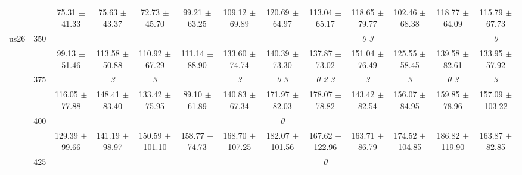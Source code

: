 \begin{table}[h]
{\begin{tabular}{
        ccccccccccccc}
 & & \cellcolor[HTML]{EFEFEF} 75.31 $\pm$ 41.33& \cellcolor[HTML]{EFEFEF} 75.63 $\pm$ 43.37& \cellcolor[HTML]{EFEFEF} 72.73 $\pm$ 45.70& \cellcolor[HTML]{EFEFEF} 99.21 $\pm$ 63.25& \cellcolor[HTML]{EFEFEF} 109.12 $\pm$ 69.89& \cellcolor[HTML]{EFEFEF} 120.69 $\pm$ 64.97& \cellcolor[HTML]{EFEFEF} 113.04 $\pm$ 65.17& \cellcolor[HTML]{EFEFEF} 118.65 $\pm$ 79.77& \cellcolor[HTML]{EFEFEF} 102.46 $\pm$ 68.38& \cellcolor[HTML]{EFEFEF} 118.77 $\pm$ 64.09& \cellcolor[HTML]{EFEFEF} 115.79 $\pm$ 67.73 \\ 
 \multirow{4}{*}{us26} & \multirow{2}{*}{350}& & & & & & & & \textit{ 0 3 }& & & \textit{ 0 } \\ 
 & & 99.13 $\pm$ 51.46& 113.58 $\pm$ 50.88& 110.92 $\pm$ 67.29& 111.14 $\pm$ 88.90& 133.60 $\pm$ 74.74& 140.39 $\pm$ 73.30& 137.87 $\pm$ 73.02& 151.04 $\pm$ 76.49& 125.55 $\pm$ 58.45& 139.58 $\pm$ 82.61& 133.95 $\pm$ 57.92 \\ 
 & \multirow{2}{*}{375}& \cellcolor[HTML]{EFEFEF} & \cellcolor[HTML]{EFEFEF} \textit{ 3 }& \cellcolor[HTML]{EFEFEF} \textit{ 3 }& \cellcolor[HTML]{EFEFEF} & \cellcolor[HTML]{EFEFEF} \textit{ 3 }& \cellcolor[HTML]{EFEFEF} \textit{ 0 3 }& \cellcolor[HTML]{EFEFEF} \textit{ 0 2 3 }& \cellcolor[HTML]{EFEFEF} \textit{ 3 }& \cellcolor[HTML]{EFEFEF} \textit{ 3 }& \cellcolor[HTML]{EFEFEF} \textit{ 0 3 }& \cellcolor[HTML]{EFEFEF} \textit{ 3 } \\ 
 & & \cellcolor[HTML]{EFEFEF} 116.05 $\pm$ 77.88& \cellcolor[HTML]{EFEFEF} 148.41 $\pm$ 83.40& \cellcolor[HTML]{EFEFEF} 133.42 $\pm$ 75.95& \cellcolor[HTML]{EFEFEF} 89.10 $\pm$ 61.89& \cellcolor[HTML]{EFEFEF} 140.83 $\pm$ 67.34& \cellcolor[HTML]{EFEFEF} 171.97 $\pm$ 82.03& \cellcolor[HTML]{EFEFEF} 178.07 $\pm$ 78.82& \cellcolor[HTML]{EFEFEF} 143.42 $\pm$ 82.54& \cellcolor[HTML]{EFEFEF} 156.07 $\pm$ 84.95& \cellcolor[HTML]{EFEFEF} 159.85 $\pm$ 78.96& \cellcolor[HTML]{EFEFEF} 157.09 $\pm$ 103.22 \\ 
 & \multirow{2}{*}{400}& & & & & & \textit{ 0 }& & & & &  \\ 
 & & 129.39 $\pm$ 99.66& 141.19 $\pm$ 98.97& 150.59 $\pm$ 101.10& 158.77 $\pm$ 74.73& 168.70 $\pm$ 107.25& 182.07 $\pm$ 101.56& 167.62 $\pm$ 122.96& 163.71 $\pm$ 86.79& 174.52 $\pm$ 104.85& 186.82 $\pm$ 119.90& 163.87 $\pm$ 82.85 \\ 
 & \multirow{2}{*}{425}& \cellcolor[HTML]{EFEFEF} & \cellcolor[HTML]{EFEFEF} & \cellcolor[HTML]{EFEFEF} & \cellcolor[HTML]{EFEFEF} & \cellcolor[HTML]{EFEFEF} & \cellcolor[HTML]{EFEFEF} & \cellcolor[HTML]{EFEFEF} \textit{ 0 }& \cellcolor[HTML]{EFEFEF} & \cellcolor[HTML]{EFEFEF} & \cellcolor[HTML]{EFEFEF} & \cellcolor[HTML]{EFEFEF}  \\ 

\end{tabular}}
\end{table}
